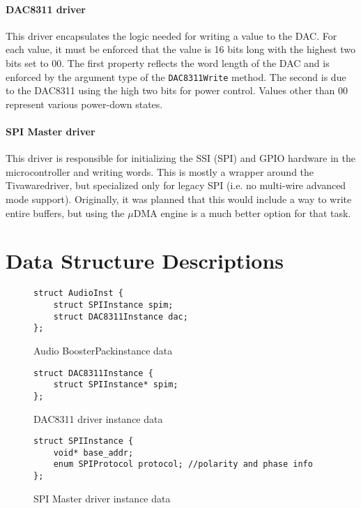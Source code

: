 \documentclass[titlepage]{article}
\begin{document}
\paragraph{DAC8311 driver}
This driver encapsulates the logic needed for writing a value to the DAC. For each value, it must be enforced that the 
value is 16 bits long with the highest two bits set to $00$. The first property reflects the word length of the DAC and is 
enforced by the argument type of the \texttt{DAC8311Write} method. The second is due to the DAC8311 using the high two 
bits for power control. Values other than $00$ represent various power-down states.

\paragraph{SPI Master driver}
This driver is responsible for initializing the SSI (SPI) and GPIO hardware in the microcontroller and writing words. This 
is mostly a wrapper around the Tivaware\textregistered\space driver, but specialized only for legacy SPI (i.e. no multi-wire advanced 
mode support). Originally, it was planned that this would include a way to write entire buffers, but using the $\mu$DMA engine is 
a much better option for that task.

\pagebreak
\section{Data Structure Descriptions}

\begin{figure}[H]
\begin{lstlisting}
struct AudioInst {
    struct SPIInstance spim;
    struct DAC8311Instance dac;
};
\end{lstlisting}
\caption{Audio BoosterPack\textregistered\space instance data}
\end{figure}

\begin{figure}[H]
\begin{lstlisting}
struct DAC8311Instance {
    struct SPIInstance* spim;
};
\end{lstlisting}
\caption{DAC8311 driver instance data}
\end{figure}

\begin{figure}[H]
\begin{lstlisting}
struct SPIInstance {
    void* base_addr;
    enum SPIProtocol protocol; //polarity and phase info
};
\end{lstlisting}
\caption{SPI Master driver instance data}
\end{figure}
\end{document}
